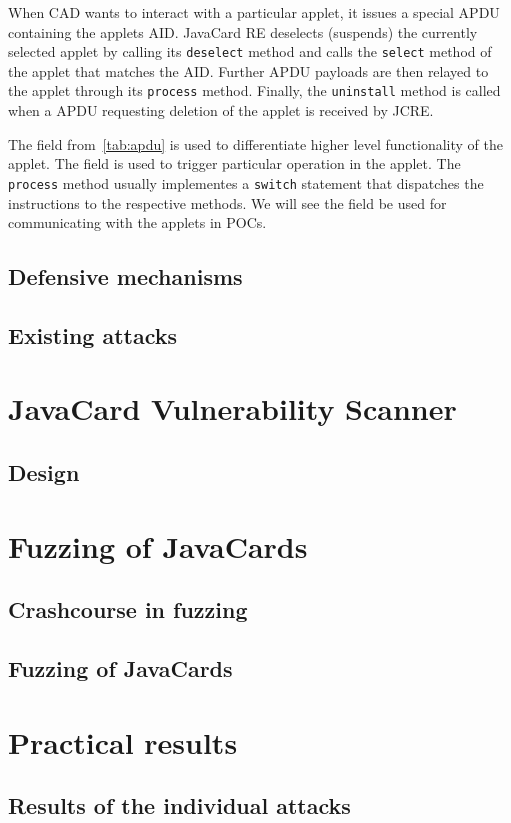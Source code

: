 \documentclass{../llncs/llncs}
\begin{document}
When CAD wants to interact with a particular applet, it issues a special APDU containing the applets AID. JavaCard RE deselects (suspends) the currently selected applet by calling its \texttt{deselect} method and calls the \texttt{select} method of the applet that matches the AID. Further APDU payloads are then relayed to the applet through its \texttt{process} method. Finally, the \texttt{uninstall} method is called when a APDU requesting deletion of the applet is received by JCRE.

    The \cla field from~\ref{tab:apdu} is used to differentiate higher level functionality of the applet. The \ins field is used to trigger particular operation in the applet. The \texttt{process} method usually implementes a \texttt{switch} statement that dispatches the \ins instructions to the respective methods. We will see the \ins field be used for communicating with the applets in POCs.

    \subsection{Defensive mechanisms}
    \subsection{Existing attacks}

\section{JavaCard Vulnerability Scanner}
    \subsection{Design}

\section{Fuzzing of JavaCards\label{sec:fuzzing}}
    \subsection{Crashcourse in fuzzing}
    \subsection{Fuzzing of JavaCards}

\section{Practical results}
    \subsection{Results of the individual attacks}


\newpage


\end{document}

